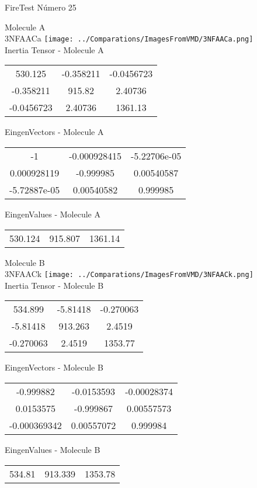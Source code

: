 \vtab[-2cm]
\begin{center}
{\large FireTest \tab Número 25}
\end{center}
\begin{multicols}{2}
\begin{center}

Molecule A \\ 
3NFAACa
\texttt{[image: ../Comparations/ImagesFromVMD/3NFAACa.png]}
\\
Inertia Tensor - Molecule A \\
\vtab

\begin{tabular}{|c c c|}
530.125	 & 	-0.358211	 & 	-0.0456723	 \\
-0.358211	 & 	915.82	 & 	2.40736	 \\
-0.0456723	 & 	2.40736	 & 	1361.13
\end{tabular}

\vtab
 EingenVectors - Molecule A     \\
\vtab
\begin{tabular}{|c c c|}
-1	 & 	-0.000928415	 & 	-5.22706e-05	 \\
0.000928119	 & 	-0.999985	 & 	0.00540587	 \\
-5.72887e-05	 & 	0.00540582	 & 	0.999985
\end{tabular}

\vtab
 EingenValues - Molecule A     \\
\vtab
\begin{tabular}{|c c c|}
530.124	 & 	915.807	 & 	1361.14	 \\
\end{tabular}
\columnbreak

Molecule B \\ 
3NFAACk
\texttt{[image: ../Comparations/ImagesFromVMD/3NFAACk.png]}
\\
Inertia Tensor - Molecule B \\
\vtab

\begin{tabular}{|c c c|}
534.899	 & 	-5.81418	 & 	-0.270063	 \\
-5.81418	 & 	913.263	 & 	2.4519	 \\
-0.270063	 & 	2.4519	 & 	1353.77
\end{tabular}

\vtab
 EingenVectors - Molecule B     \\
\vtab
\begin{tabular}{|c c c|}
-0.999882	 & 	-0.0153593	 & 	-0.00028374	 \\
0.0153575	 & 	-0.999867	 & 	0.00557573	 \\
-0.000369342	 & 	0.00557072	 & 	0.999984
\end{tabular}

\vtab
 EingenValues - Molecule B     \\
\vtab
\begin{tabular}{|c c c|}
534.81	 & 	913.339	 & 	1353.78	 \\
\end{tabular}

\end{center}
\end{multicols}
